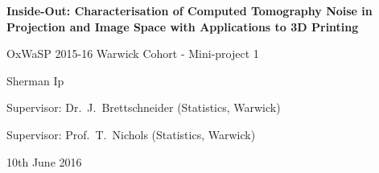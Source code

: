 \documentclass[12pt]{report}
\begin{document}
\begin{titlepage}
\centering
\vspace*{1cm}
        
        \LARGE
        \textbf{Inside-Out: Characterisation of Computed Tomography Noise in Projection and Image Space with Applications to 3D Printing}
        
		\large        
        
        \vspace{2cm}
        {OxWaSP 2015-16 Warwick Cohort - Mini-project 1}
        
        \vspace{1cm}
        {Sherman Ip}

        \vspace{1cm}
        {Supervisor: Dr.~J.~Brettschneider (Statistics, Warwick)}
        
        \vspace{1cm}
        {Supervisor: Prof.~T.~Nichols (Statistics, Warwick)}
        
        \vspace{1cm}
        {10th June 2016}
\end{titlepage}

\begin{abstract}
X-ray computed tomography can be used to do quality control on 3D printed samples. However there are sources of error in the 3D printing, how the photons behave and in the X-ray detector. This projects aims to find a relationship between the mean and variance of the grey values of each pixel in images obtained from the X-ray detector by fitting linear regressions. In addition, latent variable models such as principle component analysis, factor analysis and the compound Poisson were attempted to be fitted to find sources of variance.
\end{abstract}

\renewcommand{\abstractname}{Acknowledgements}
\begin{abstract}
\begin{itemize}
	\item Supervisors: Julia Brettschneider and Tom Nichols
	\item Inside Out Team: Wilfrid Kendall, Audrey Kueh, Jay Warnett and Clair Barnes
	\item OxWaSP 2015 Cohort: Nathan Cunningham, Giuseppe di Benedetto, Beniamino Hadj-Amar, Jack Jewson, Ella Kaye, Leon Law, Kaspar Martens, Marcin Mider, Xenia Miscouridou, Paul Vanetti and Andi Wang.
	\item EPSRC Funding: EP/L016710/1
\end{itemize}
\end{abstract}
\end{document}
